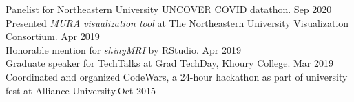 \documentclass[a4paper]{article}
\newcommand{\mybullet}{
	\indent 
  \textbullet \hspace*{2mm}
}
\begin{document}
    \mybullet Panelist for Northeastern University UNCOVER COVID datathon. \hfill Sep 2020 \\
    \mybullet Presented \textit{MURA visualization tool} at The Northeastern University 
    Visualization Consortium. \hfill Apr 2019 \\
    \mybullet Honorable mention for \textit{shinyMRI} by RStudio. \hfill Apr 2019 \\
    \mybullet Graduate speaker for TechTalks at Grad TechDay, Khoury College. \hfill Mar 2019 \\
		\mybullet Coordinated and organized CodeWars, a 24-hour hackathon as part of 
		university fest at Alliance University.\hfill Oct 2015\\
		
	
\end{document}
